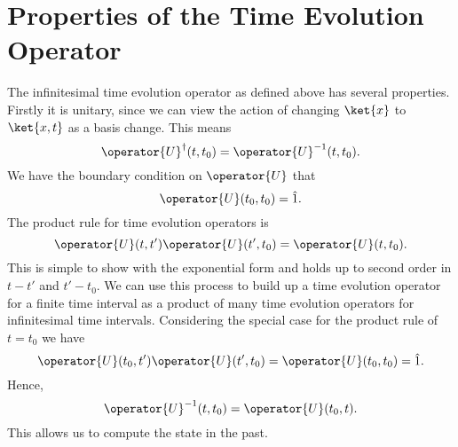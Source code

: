 \documentclass[fleqn]{NotesClass}
\newcommand*{\idop}{\hat{1}}
\newcommand*{\hermit}{\dagger}
\begin{document}
    \section{Properties of the Time Evolution Operator}
    The infinitesimal time evolution operator as defined above has several properties.
    Firstly it is unitary, since we can view the action of changing \(\ket{x}\) to \(\ket{x, t}\) as a basis change.
    This means
    \begin{equation}
        \operator{U}^\hermit(t, t_0) = \operator{U}^{-1}(t, t_0).
    \end{equation}
    We have the boundary condition on \(\operator{U}\) that
    \begin{equation}
        \operator{U}(t_0, t_0) = \idop.
    \end{equation}
    The product rule for time evolution operators is
    \begin{equation}
        \operator{U}(t, t')\operator{U}(t', t_0) = \operator{U}(t, t_0).
    \end{equation}
    This is simple to show with the exponential form and holds up to second order in \(t - t'\) and \(t' - t_0\).
    We can use this process to build up a time evolution operator for a finite time interval as a product of many time evolution operators for infinitesimal time intervals.
    Considering the special case for the product rule of \(t = t_0\) we have
    \begin{equation}
        \operator{U}(t_0, t')\operator{U}(t', t_0) = \operator{U}(t_0, t_0) = \idop.
    \end{equation}
    Hence,
    \begin{equation}
        \operator{U}^{-1}(t, t_0) = \operator{U}(t_0, t).
    \end{equation}
    This allows us to compute the state in the past.
    
\end{document}

